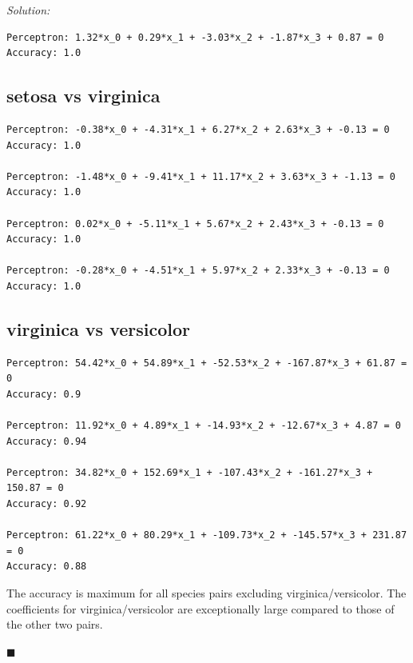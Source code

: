 \documentclass{article}
\newenvironment{solution}
    {\textit{Solution:}\\}
    {$\blacksquare$}
\begin{document}
\begin{solution}
\begin{verbatim}
Perceptron: 1.32*x_0 + 0.29*x_1 + -3.03*x_2 + -1.87*x_3 + 0.87 = 0
Accuracy: 1.0
\end{verbatim}
\subsection*{setosa vs virginica}
\begin{verbatim}
Perceptron: -0.38*x_0 + -4.31*x_1 + 6.27*x_2 + 2.63*x_3 + -0.13 = 0
Accuracy: 1.0

Perceptron: -1.48*x_0 + -9.41*x_1 + 11.17*x_2 + 3.63*x_3 + -1.13 = 0
Accuracy: 1.0

Perceptron: 0.02*x_0 + -5.11*x_1 + 5.67*x_2 + 2.43*x_3 + -0.13 = 0
Accuracy: 1.0

Perceptron: -0.28*x_0 + -4.51*x_1 + 5.97*x_2 + 2.33*x_3 + -0.13 = 0
Accuracy: 1.0
\end{verbatim}
\subsection*{virginica vs versicolor}
\begin{verbatim}
Perceptron: 54.42*x_0 + 54.89*x_1 + -52.53*x_2 + -167.87*x_3 + 61.87 = 0
Accuracy: 0.9

Perceptron: 11.92*x_0 + 4.89*x_1 + -14.93*x_2 + -12.67*x_3 + 4.87 = 0
Accuracy: 0.94

Perceptron: 34.82*x_0 + 152.69*x_1 + -107.43*x_2 + -161.27*x_3 + 150.87 = 0
Accuracy: 0.92

Perceptron: 61.22*x_0 + 80.29*x_1 + -109.73*x_2 + -145.57*x_3 + 231.87 = 0
Accuracy: 0.88
\end{verbatim}

The accuracy is maximum for all species pairs excluding 
virginica/versicolor. The coefficients for virginica/versicolor 
are exceptionally large compared to those of the other two 
pairs.

\end{solution}
\end{document}
